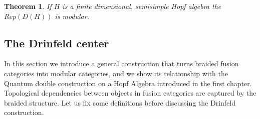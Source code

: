 \documentclass{article}
\newtheorem{theorem}{Theorem}
\begin{document}
\begin{theorem}
	If $H$ is a finite dimensional, semisimple Hopf algebra the $Rep(D(H))$ is modular.
\end{theorem}

\subsection{The Drinfeld center}
In this section we introduce a general construction that turns braided fusion categories into modular categories, and we show its relationship with the Quantum double construction on a Hopf Algebra introduced in the first chapter.\\
Topological dependencies between objects in fusion categories are captured by the braided structure. Let us fix some definitions before discussing the Drinfeld construction.
\end{document}

